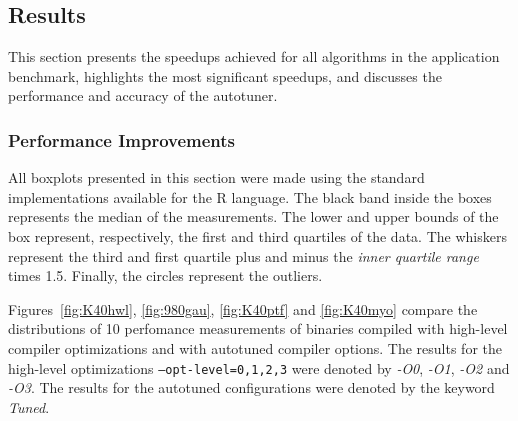 \subsection{Results}
\label{sec:GPUresults}

This section presents the speedups achieved for all algorithms in the
application benchmark, highlights the most significant speedups, and discusses
the performance and accuracy of the autotuner.

\subsubsection{Performance Improvements}

All boxplots presented in this section were made using the standard
implementations available for the R language.  The black band inside the boxes
represents the median of the measurements. The lower and upper bounds of the
box represent, respectively, the first and third quartiles of the data. The
whiskers represent the third and first quartile plus and minus the \emph{inner
quartile range} times 1.5. Finally, the circles represent the outliers.

Figures~\ref{fig:K40hwl}, \ref{fig:980gau}, \ref{fig:K40ptf} and
\ref{fig:K40myo} compare the distributions of 10 perfomance measurements of
binaries compiled with high-level compiler optimizations and with autotuned
compiler options. The results for the high-level optimizations
\texttt{--opt-level=0,1,2,3} were denoted by \emph{-O0}, \emph{-O1}, \emph{-O2}
and \emph{-O3}.  The results for the autotuned configurations were denoted by
the keyword \emph{Tuned}.

